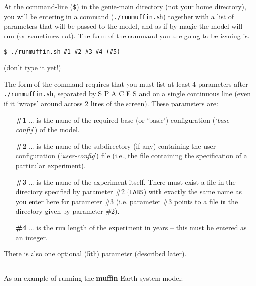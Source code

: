 \documentclass[11pt,fleqn]{book} %
\begin{document}
At the command-line (\texttt{\$}) in the genie-main directory (not your home directory), you will be entering in a command (\texttt{./runmuffin.sh}) together with a list of parameters that will be passed to the model, and as if by magic the model will run (or sometimes not). The form of the command you are going to be issuing is:

\vspace{-1mm}
\begin{verbatim}
$ ./runmuffin.sh #1 #2 #3 #4 (#5)
\end{verbatim}
\vspace{-1mm}

\noindent(\uline{don't type it yet}!)

\vspace{1mm}
The form of the command requires that you must list at least 4 parameters after \texttt{./runmuffin.sh}, separated by S P A C E S and on a single continuous line (even if it ‘wraps’ around across 2 lines of the screen).
These parameters are:

\vspace{2mm}
\begin{enumerate}[noitemsep]
\setlength{\itemindent}{.2in}
\item[\textbf{\#1}] ... is the name of the required base (or ‘basic’) configuration (‘\textit{base-config}’) of the model.
\item[\textbf{\#2}] ... is the name of the subdirectory (if any) containing the user configuration (‘\textit{user-config}’) file (i.e., the file containing the specification of a particular experiment). 
\item[\textbf{\#3}] ... is the name of the experiment itself. There must exist a file in the directory specified by parameter \#2 (\texttt{LABS}) with exactly the same name as you enter here for parameter \#3 (i.e. parameter \#3 points to a file in the directory given by parameter \#2).
\item[\textbf{\#4}] ... is the run length of the experiment in years – this must be entered as an integer.
\end{enumerate}

There is also one optional (5th) parameter (described later).

\vspace{1mm}
\noindent\rule{4cm}{0.1mm}
\vspace{2mm}

\noindent As an example of running the \textbf{muffin} Earth system model:
\end{document}

